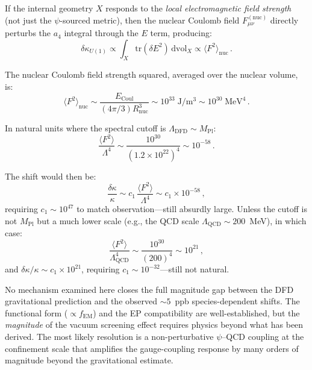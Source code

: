 \documentclass[aps,prd,twocolumn,superscriptaddress,nofootinbib]{revtex4-2}
\newcommand{\ee}[1]{\times 10^{#1}}
\newcommand{\kap}{\kappa}
\newcommand{\fEM}{f_{\mathrm{EM}}}
\begin{document}
If the internal geometry $X$ responds to the \emph{local electromagnetic
field strength} (not just the $\psi$-sourced metric), then the nuclear
Coulomb field $F_{\mu\nu}^{(\mathrm{nuc})}$ directly perturbs the
$a_4$ integral through the $E$ term, producing:
\begin{equation}\label{eq:direct}
\delta\kap_{U(1)} \propto \int_X \mathrm{tr}(\delta E^2)\,
\mathrm{dvol}_X \propto \langle F^2\rangle_{\mathrm{nuc}}\,.
\end{equation}

The nuclear Coulomb field strength squared, averaged over the nuclear
volume, is:
\begin{equation}
\langle F^2\rangle_{\mathrm{nuc}} \sim
\frac{E_{\mathrm{Coul}}}{(4\pi/3)R_{\mathrm{nuc}}^3}
\sim 10^{33}\;\mathrm{J/m^3} \sim 10^{30}\;\mathrm{MeV^4}\,.
\end{equation}

In natural units where the spectral cutoff is $\Lambda_{\mathrm{DFD}}
\sim M_{\mathrm{Pl}}$:
\begin{equation}
\frac{\langle F^2\rangle}{\Lambda^4} \sim
\frac{10^{30}}{(1.2\ee{22})^4} \sim 10^{-58}\,.
\end{equation}

The shift would then be:
\begin{equation}
\frac{\delta\kap}{\kap} \sim c_1\,\frac{\langle F^2\rangle}{\Lambda^4}
\sim c_1 \times 10^{-58}\,,
\end{equation}
requiring $c_1 \sim 10^{47}$ to match observation---still absurdly
large.  Unless the cutoff is not $M_{\mathrm{Pl}}$ but a much lower
scale (e.g., the QCD scale $\Lambda_{\mathrm{QCD}} \sim 200$~MeV),
in which case:
\begin{equation}
\frac{\langle F^2\rangle}{\Lambda_{\mathrm{QCD}}^4}
\sim \frac{10^{30}}{(200)^4} \sim 10^{21}\,,
\end{equation}
and $\delta\kap/\kap \sim c_1 \times 10^{21}$, requiring
$c_1 \sim 10^{-32}$---still not natural.

\begin{tcolorbox}[colback=yellow!5!white, colframe=yellow!50!black,
title=Status of the Magnitude Gap]
No mechanism examined here closes the full magnitude gap between the
DFD gravitational prediction and the observed $\sim\!5$~ppb
species-dependent shifts.  The functional form ($\propto \fEM$) and
the EP compatibility are well-established, but the \emph{magnitude}
of the vacuum screening effect requires physics beyond what has been
derived.  The most likely resolution is a non-perturbative
$\psi$--QCD coupling at the confinement scale that amplifies the
gauge-coupling response by many orders of magnitude beyond the
gravitational estimate.
\end{tcolorbox}
\end{document}
